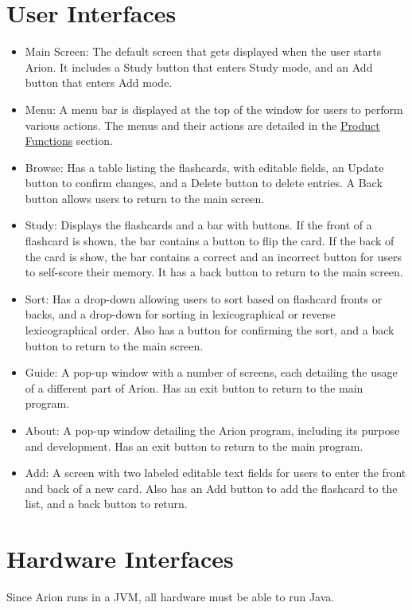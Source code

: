 \documentclass{scrreprt}
\begin{document}
\section{User Interfaces}
\begin{itemize}
    \item
        Main Screen: The default screen that gets displayed when the user starts Arion.
        It includes a Study button that enters Study mode,
        and an Add button that enters Add mode.
    \item
        Menu: A menu bar is displayed at the top of the window for users to perform various actions.
        The menus and their actions are detailed in the \hyperref[sec:Product-Functions]{Product Functions} section.
    \item 
        Browse: Has a table listing the flashcards, with editable fields, an Update button to confirm changes,
        and a Delete button to delete entries. A Back button allows users to return to the main screen.
    \item
        Study: Displays the flashcards and a bar with buttons.
        If the front of a flashcard is shown, the bar contains a button to flip the card. 
        If the back of the card is show, the bar contains a correct and an incorrect button for users to self-score
        their memory. It has a back button to return to the main screen.
    \item 
        Sort: Has a drop-down allowing users to sort based on flashcard fronts or backs,
        and a drop-down for sorting in lexicographical or reverse lexicographical order. 
        Also has a button for confirming the sort, and a back button to return to the main screen.
    \item 
        Guide: A pop-up window with a number of screens, each detailing the usage of a
        different part of Arion. Has an exit button to return to the main program.
    \item 
        About: A pop-up window detailing the Arion program, including its purpose and development.
        Has an exit button to return to the main program.
    \item 
        Add: A screen with two labeled editable text fields for users to enter the front and
        back of a new card. Also has an Add button to add the flashcard to the list, and
        a back button to return.
\end{itemize}

\section{Hardware Interfaces}
Since Arion runs in a JVM, all hardware must be able to run Java.
\end{document}
